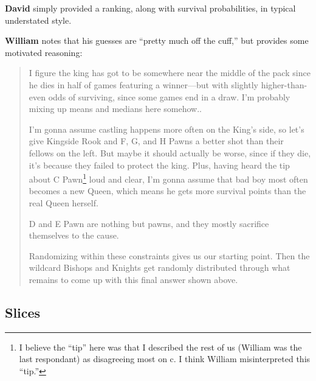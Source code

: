 \documentclass[twocolumn]{article}
\begin{document}
{\bf David} simply provided a ranking, along with survival
probabilities, in typical understated style.

\medskip
{\bf William} notes that his guesses are
``pretty much off the cuff,'' but provides some motivated reasoning:

\begin{quote}
I figure the king has got to be somewhere near the middle of the pack
since he dies in half of games featuring a winner---but with slightly
higher-than-even odds of surviving, since some games end in a draw.
I'm probably mixing up means and medians here somehow..

I'm gonna assume castling happens more often on the King's side, so
let's give Kingside Rook and F, G, and H Pawns a better shot than
their fellows on the left. But maybe it should actually be worse,
since if they die, it's because they failed to protect the king. Plus,
having heard the tip about C Pawn\footnote{I believe the ``tip'' here
  was that I described the rest of us (William was the last
  respondant) as disagreeing most on \pawn c. I think William
  misinterpreted this ``tip.''} loud and clear, I'm gonna assume that
bad boy most often becomes a new Queen, which means he gets more
survival points than the real Queen herself.

D and E Pawn are nothing but pawns, and they mostly sacrifice
themselves to the cause.

Randomizing within these constraints gives us our starting point. Then
the wildcard Bishops and Knights get randomly distributed through what
remains to come up with this final answer shown above.
\end{quote}


\subsection{Slices} \label{sec:slices}
\end{document}
